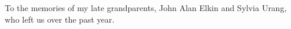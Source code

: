 \documentclass[12pt]{uthesis-v12}  %
\begin{document}

\begin{dedication}
\noindent To the memories of my late grandparents, John Alan Elkin and Sylvia Urang, who left us over the past year.
\end{dedication}

\end{document}
